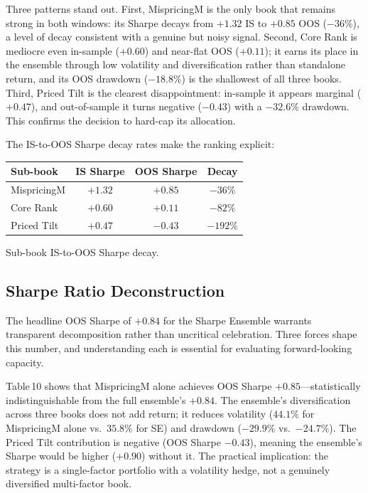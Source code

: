 \documentclass[11pt,a4paper]{article}
\begin{document}
Three patterns stand out. First, MispricingM is the only book that remains strong in both windows: its Sharpe decays from $+1.32$ IS to $+0.85$ OOS ($-36\%$), a level of decay consistent with a genuine but noisy signal. Second, Core Rank is mediocre even in-sample ($+0.60$) and near-flat OOS ($+0.11$); it earns its place in the ensemble through low volatility and diversification rather than standalone return, and its OOS drawdown ($-18.8\%$) is the shallowest of all three books. Third, Priced Tilt is the clearest disappointment: in-sample it appears marginal ($+0.47$), and out-of-sample it turns negative ($-0.43$) with a $-32.6\%$ drawdown. This confirms the decision to hard-cap its allocation.

The IS-to-OOS Sharpe decay rates make the ranking explicit:

\begin{center}
\small
\begin{tabular}{lccc}
\toprule
\rowcolor{tablehead}
\textbf{Sub-book} & \textbf{IS Sharpe} & \textbf{OOS Sharpe} & \textbf{Decay} \\
\midrule
MispricingM  & $+1.32$ & $+0.85$ & $-36\%$ \\
Core Rank    & $+0.60$ & $+0.11$ & $-82\%$ \\
Priced Tilt  & $+0.47$ & $-0.43$ & $-192\%$ \\
\bottomrule
\end{tabular}
\end{center}
\smallskip
{\small Sub-book IS-to-OOS Sharpe decay.}

\subsection{Sharpe Ratio Deconstruction}

The headline OOS Sharpe of $+0.84$ for the Sharpe Ensemble warrants transparent decomposition rather than uncritical celebration. Three forces shape this number, and understanding each is essential for evaluating forward-looking capacity.

\begin{callout}[title=Alpha source concentration]
Table\,10 shows that MispricingM alone achieves OOS Sharpe $+0.85$---statistically indistinguishable from the full ensemble's $+0.84$. The ensemble's diversification across three books does not add return; it reduces volatility ($44.1\%$ for MispricingM alone vs.\ $35.8\%$ for SE) and drawdown ($-29.9\%$ vs.\ $-24.7\%$). The Priced Tilt contribution is negative (OOS Sharpe $-0.43$), meaning the ensemble's Sharpe would be higher ($+0.90$) without it. The practical implication: the strategy is a single-factor portfolio with a volatility hedge, not a genuinely diversified multi-factor book.
\end{callout}
\end{document}
